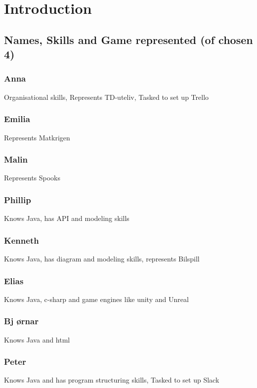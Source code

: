 \documentclass[11pt]{meetingmins}
\begin{document}
\maketitle

\section{Introduction}
\subsection{Names, Skills and Game represented (of chosen 4)}

\subsubsection{Anna}
Organisational skills, Represents TD-uteliv, Tasked to set up Trello

\subsubsection{Emilia}
Represents Matkrigen

\subsubsection{Malin}
Represents Spooks

\subsubsection{Phillip}
Knows Java, has API and modeling skills

\subsubsection{Kenneth}
Knows Java, has diagram and modeling skills, represents Bilspill

\subsubsection{Elias}
Knows Java, c-sharp and game engines like unity and Unreal

\subsubsection{Bj \o rnar}
Knows Java and html

\subsubsection{Peter}
Knows Java and has program structuring skills, Tasked to set up Slack
\end{document}
